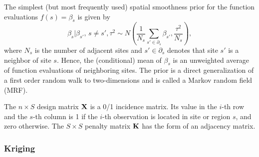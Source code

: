 \documentclass[11pt,a4paper,twoside]{bayesxarticle}
\begin{document}
The simplest (but most frequently used) spatial smoothness prior for
the function evaluations $f(s)=\beta_{s}$ is given by
\begin{equation}
\label{adjacency} \beta_{s} | \beta_{s'}, \, {s \neq
s'},\tau^2 \sim N \left( \frac{1}{N_s} \sum_{s' \in \partial_s}
\beta_{s'} , \frac{\tau^2}{N_s} \right),
\end{equation}
where $N_s$ is the number of adjacent sites and $s' \in
\partial_s$ denotes that site $s'$ is a neighbor of site $s$. Hence,
the (conditional) mean of $\beta_{s}$ is an unweighted average of
function evaluations of neighboring sites. The prior is a direct
generalization of a first order random walk to two-dimensions and is
called a Markov random field (MRF).


The $n \times S$ design matrix $\mathbf{X}$ is a 0/1 incidence matrix. Its
value in the $i$-th row and the $s$-th column is 1 if the $i$-th
observation is located in site or region $s$, and zero otherwise.
The $S \times S$ penalty matrix $\mathbf{K}$ has the form of an adjacency
matrix.

\subsubsection{Kriging}
\end{document}
